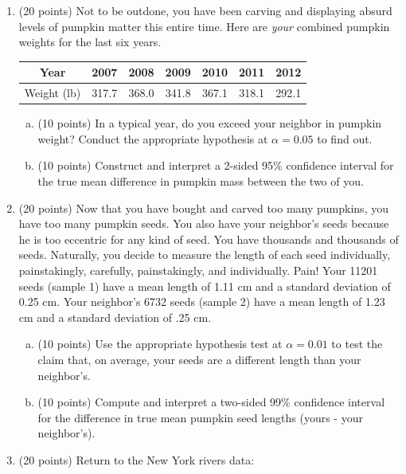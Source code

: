 \documentclass{article}\usepackage{graphicx, color}
\numberwithin{equation}{section}
\begin{document}
\begin{flushleft}
\begin{enumerate}[1. ]
\item (20 points) Not to be outdone, you have been carving and displaying absurd levels of pumpkin matter this entire time. Here are \emph{your} combined pumpkin weights for the last six years.

\begin{center}
\begin{tabular}{c|cccccc}
Year & 2007 & 2008 & 2009 & 2010 & 2011 & 2012 \\ \hline
Weight (lb) & 317.7 & 368.0 & 341.8 & 367.1 & 318.1 & 292.1   \\ 
\end{tabular}
\end{center}

\begin{enumerate}[a. ]
\item (10 points) In a typical year, do you exceed your neighbor in pumpkin weight? Conduct the appropriate hypothesis at $\alpha = 0.05$ to find out.
\item (10 points) Construct and interpret a 2-sided 95\% confidence interval for the true mean difference in pumpkin mass between the two of you.
\end{enumerate}


\item (20 points) Now that you have bought and carved too many pumpkins, you have too many pumpkin seeds. You also have your neighbor's seeds because he is too eccentric for any kind of seed. You have thousands and thousands of seeds. Naturally, you decide to measure the length of each seed individually, painstakingly, carefully, painstakingly, and individually. Pain! Your 11201 seeds (sample 1) have a mean length of 1.11 cm and a standard deviation of 0.25 cm. Your neighbor's 6732 seeds (sample 2) have a mean length of 1.23 cm and a standard deviation of .25 cm. 

\begin{enumerate}[a. ]
\item (10 points) Use the appropriate hypothesis test at $\alpha = 0.01$ to test the claim that, on average, your seeds are a different length than your neighbor's.
\item (10 points) Compute and interpret a two-sided 99\% confidence interval for the difference in true mean pumpkin seed lengths (yours - your neighbor's).
\end{enumerate}





\item (20 points) Return to the New York rivers data:


\end{enumerate}
\end{flushleft}
\end{document}
